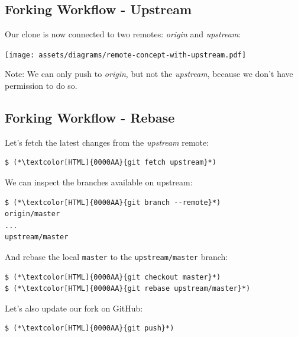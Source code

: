 \subsection{Forking Workflow - Upstream}
\begin{frame}[fragile]
  \subslidetitle

  Our clone is now connected to two remotes: \textit{origin} and \textit{upstream}:

  \vspace{3em}
  \centerline{\texttt{[image: assets/diagrams/remote-concept-with-upstream.pdf]}}

  \vspace{1em}
  Note: We can only push to \textit{origin}, but not the \textit{upstream}, because
  we don't have permission to do so.

\end{frame}

\subsection{Forking Workflow - Rebase}
\begin{frame}[fragile]
  \subslidetitle

  Let's fetch the latest changes from the \textit{upstream} remote:

  \begin{lstlisting}
$ (*\textcolor[HTML]{0000AA}{git fetch upstream}*)
\end{lstlisting}

  We can inspect the branches available on upstream:

  \begin{lstlisting}
$ (*\textcolor[HTML]{0000AA}{git branch --remote}*)
origin/master
...
upstream/master
\end{lstlisting}

  And rebase the local \lstinline{master} to the \lstinline{upstream/master} branch:

  \begin{lstlisting}
$ (*\textcolor[HTML]{0000AA}{git checkout master}*)
$ (*\textcolor[HTML]{0000AA}{git rebase upstream/master}*)
\end{lstlisting}

  Let's also update our fork on GitHub:

  \begin{lstlisting}
$ (*\textcolor[HTML]{0000AA}{git push}*)
\end{lstlisting}

\end{frame}

